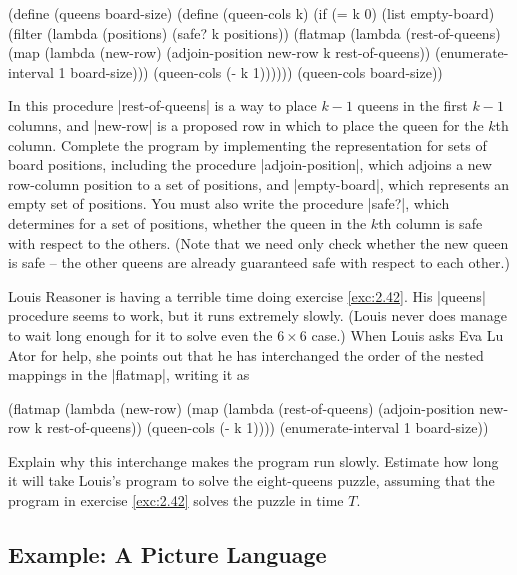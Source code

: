 \begin{Exercise}
\begin{Exercise}
\begin{schemedisplay}
(define (queens board-size)
  (define (queen-cols k)  
    (if (= k 0)
        (list empty-board)
        (filter
         (lambda (positions) (safe? k positions))
         (flatmap
          (lambda (rest-of-queens)
            (map (lambda (new-row)
                   (adjoin-position new-row k rest-of-queens))
                 (enumerate-interval 1 board-size)))
          (queen-cols (- k 1))))))
  (queen-cols board-size))
\end{schemedisplay}
In this procedure \scheme|rest-of-queens| is a way to place $k - 1$
queens in the first $k - 1$ columns, and \scheme|new-row| is a
proposed row in which to place the queen for the $k$th column.
Complete the program by implementing the representation for sets of
board positions, including the procedure \scheme|adjoin-position|,
which adjoins a new row-column position to a set of positions, and
\scheme|empty-board|, which represents an empty set of positions.  You
must also write the procedure \scheme|safe?|, which determines for a
set of positions, whether the queen in the $k$th column is safe with
respect to the others.  (Note that we need only check whether the new
queen is safe -- the other queens are already guaranteed safe with
respect to each other.)



\begin{Exercise}
\label{exc:2.43}
Louis Reasoner is having a terrible time doing exercise \ref{exc:2.42}.  His
\scheme|queens| procedure seems to work, but it runs extremely slowly.
(Louis never does manage to wait long enough for it to solve even the
$6 \times 6$ case.)  When Louis asks Eva Lu Ator for help, she points
out that he has interchanged the order of the nested mappings in the
\scheme|flatmap|, writing it as
\begin{schemedisplay}
(flatmap
 (lambda (new-row)
   (map (lambda (rest-of-queens)
          (adjoin-position new-row k rest-of-queens))
        (queen-cols (- k 1))))
 (enumerate-interval 1 board-size))
\end{schemedisplay}
Explain why this interchange makes the program run slowly.  Estimate
how long it will take Louis's program to solve the eight-queens
puzzle, assuming that the program in exercise \ref{exc:2.42} solves
the puzzle in time $T$.



\subsection{Example: A Picture Language}
\label{sec:2.2.4}



\end{Exercise}
\end{Exercise}
\end{Exercise}
